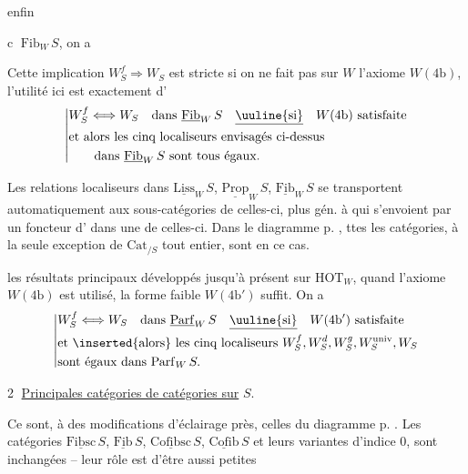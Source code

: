 enfin

\textcircled{c}  \uline{$\mathrm{Fib}$}$_W\,S$, on a

Cette implication $W_S^f\Rightarrow W_S$ est stricte si on ne fait pas
sur $W$ l'axiome $W(4\mathrm{b})$,  l'utilité ici est
exactement d'
\[
\left|\begin{aligned}
&W_S^f\Longleftrightarrow W_S\quad\text{dans }\underline{\mathrm{Fib}}_W\,S
  \quad\underline{\text{\uuline{si}}}\quad W(4\mathrm{b})\ \text{satisfaite}\\
&\text{et alors les cinq localiseurs envisagés ci-dessus}\\
&\qquad\text{dans }\underline{\mathrm{Fib}}_W\,S\text{ sont tous égaux.}
\end{aligned}\right.
\]

 Les relations  localiseurs  dans
$\underline{\mathrm{Liss}}_W\,S$, $\underline{\mathrm{Prop}}_W\,S$, $\underline{\mathrm{Fib}}_W\,S$ se transportent automatiquement aux sous-catégories de celles-ci, plus gén. à   qui s'envoient par un foncteur
d' dans une de celles-ci. Dans le diagramme
p. , ttes les catégories, à la seule exception
de $\mathrm{Cat}_{/S}$ tout entier, sont  en ce cas.

 les résultats principaux développés jusqu'à
présent sur $\mathrm{HOT}_W$, quand l'axiome $W(4\mathrm{b})$ est
utilisé, la forme faible \deleted{\unsure{(}}$W(4\mathrm{b}')$ suffit.  On a
\[
\left|\begin{aligned}
&W_S^f\Longleftrightarrow W_S\quad\text{dans }\underline{\mathrm{Parf}}_W\,S
 \quad\underline{\text{\uuline{si}}}\quad W(4\mathrm{b}')\ \text{satisfaite}\\
&\text{et \inserted{alors} les cinq localiseurs }W_S^f,W_S^d,W_S^g,W_S^{\mathrm{univ}},W_S\\
&\text{sont égaux dans }\mathrm{Parf}_W\,S .
\end{aligned}\right.
\]

\textcircled{2} \uline{Principales catégories de catégories sur} $S$.

Ce sont, à des modifications d'éclairage près, celles
du diagramme p. . Les catégories $\underline{\mathrm{Fibsc}}\,S$, $\underline{\mathrm{Fib}}\,S$,
$\underline{\mathrm{Cofibsc}}\,S$, $\underline{\mathrm{Cofib}}\,S$ et leurs variantes d'indice $0$,
sont inchangées -- leur rôle est d'être aussi petites
